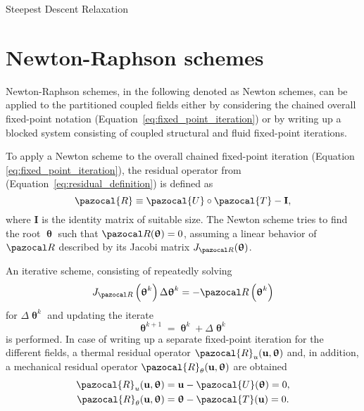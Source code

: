  Steepest Descent Relaxation

\section{Newton-Raphson schemes}

Newton-Raphson schemes, in the following denoted as Newton schemes, can be applied to the partitioned coupled fields either by considering the chained overall fixed-point notation (Equation~\eqref{eq:fixed_point_iteration}) or by writing up a blocked system consisting of coupled structural and fluid fixed-point iterations.

To apply a Newton scheme to the overall chained fixed-point iteration (Equation \eqref{eq:fixed_point_iteration}), the residual operator from (Equation~\eqref{eq:residual_definition}) is defined as
\begin{equation} \label{eq:residual_fixed_point}
\pazocal{R}\equiv\pazocal{U} \circ \pazocal {T}-\mathbf{I},
\end{equation}
where $\mathbf{I}$ is the identity matrix of suitable size.
The Newton scheme tries to find the root $\bm \uptheta$ such that $\pazocal R(\bm \uptheta)=0$, assuming a linear behavior of $\pazocal R$ described by its Jacobi matrix $J_{\pazocal R}(\bm \uptheta)$.

An iterative scheme, consisting of repeatedly solving
\begin{equation} \label{eq:newton_raphson}
J_{\pazocal R}\left(\bm \uptheta^{k}\right) \Delta \bm \uptheta^{k}=-\pazocal R\left(\bm \uptheta^{k}\right)
\end{equation}
for $\Delta \bm \uptheta^{k}$ and updating the iterate
\begin{equation}
\bm \uptheta^{k+1}= \bm \uptheta^{k}+\Delta \bm \uptheta^{k}
\end{equation}
is performed.
In case of writing up a separate fixed-point iteration for the different fields, a thermal residual operator $\pazocal{R}_{u}(\mathbf{u}, \bm{\uptheta})$ and, in addition, a mechanical residual operator $\pazocal{R}_{\theta}(\mathbf{u}, \bm{\uptheta})$ are obtained
\begin{gather}
\pazocal{R}_{u}(\mathbf{u}, \bm{\uptheta})=\mathbf{u}-\pazocal{U}(\bm{\uptheta})=0, \\
\pazocal{R}_{\theta}(\mathbf{u}, \bm{\uptheta})=\bm{\uptheta}-\pazocal{T}(\mathbf{u})=0.
\end{gather}

